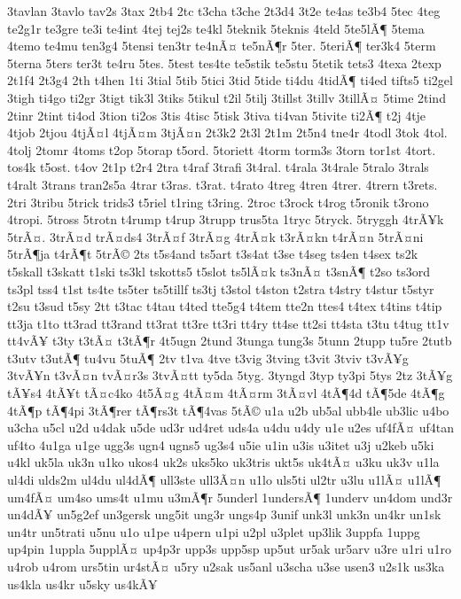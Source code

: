 {3tavlan
3tavlo
tav2s
3tax
2tb4
2tc
t3cha
t3che
2t3d4
3t2e
te4as
te3b4
5tec
4teg
te2g1r
te3gre
te3i
te4int
4tej
tej2s
te4kl
5teknik
5teknis
4teld
5te5lÃ¶
5tema
4temo
te4mu
ten3g4
5tensi
ten3tr
te4nÃ¤
te5nÃ¶r
5ter.
5teriÃ¶
ter3k4
5term
5terna
5ters
ter3t
te4ru
5tes.
5test
tes4te
te5stik
te5stu
5tetik
tets3
4texa
2texp
2t1f4
2t3g4
2th
t4hen
1ti
3tial
5tib
5tici
3tid
5tide
ti4du
4tidÃ¶
ti4ed
tifts5
ti2gel
3tigh
ti4go
ti2gr
3tigt
tik3l
3tiks
5tikul
t2il
5tilj
3tillst
3tillv
3tillÃ¤
5time
2tind
2tinr
2tint
ti4od
3tion
ti2os
3tis
4tisc
5tisk
3tiva
ti4van
5tivite
ti2Ã¶
t2j
4tje
4tjob
2tjou
4tjÃ¤l
4tjÃ¤m
3tjÃ¤n
2t3k2
2t3l
2t1m
2t5n4
tne4r
4todl
3tok
4tol.
4tolj
2tomr
4toms
t2op
5torap
t5ord.
5toriett
4torm
torm3s
3torn
tor1st
4tort.
tos4k
t5ost.
t4ov
2t1p
t2r4
2tra
t4raf
3trafi
3t4ral.
t4rala
3t4rale
5tralo
3trals
t4ralt
3trans
tran2s5a
4trar
t3ras.
t3rat.
t4rato
4treg
4tren
4trer.
4trern
t3rets.
2tri
3tribu
5trick
trids3
t5riel
t1ring
t3ring.
2troc
t3rock
t4rog
t5ronik
t3rono
4tropi.
5tross
5trotn
t4rump
t4rup
3trupp
trus5ta
1tryc
5tryck.
5tryggh
4trÃ¥k
5trÃ¤.
3trÃ¤d
trÃ¤ds4
3trÃ¤f
3trÃ¤g
4trÃ¤k
t3rÃ¤kn
t4rÃ¤n
5trÃ¤ni
5trÃ¶ja
t4rÃ¶t
5trÃ©
2ts
t5s4and
ts5art
t3s4at
t3se
t4seg
ts4en
t4sex
ts2k
t5skall
t3skatt
t1ski
ts3kl
tskotts5
t5slot
ts5lÃ¤k
ts3nÃ¤
t3snÃ¶
t2so
ts3ord
ts3pl
tss4
t1st
ts4te
ts5ter
ts5tillf
ts3tj
t3stol
t4ston
t2stra
t4stry
t4stur
t5styr
t2su
t3sud
t5sy
2tt
t3tac
t4tau
t4ted
tte5g4
t4tem
tte2n
ttes4
t4tex
t4tins
t4tip
tt3ja
t1to
tt3rad
tt3rand
tt3rat
tt3re
tt3ri
tt4ry
tt4se
tt2si
tt4sta
t3tu
t4tug
tt1v
tt4vÃ¥
t3ty
t3tÃ¤
t3tÃ¶r
4t5ugn
2tund
3tunga
tung3s
5tunn
2tupp
tu5re
2tutb
t3utv
t3utÃ¶
tu4vu
5tuÃ¶
2tv
t1va
4tve
t3vig
3tving
t3vit
3tviv
t3vÃ¥g
3tvÃ¥n
t3vÃ¤n
tvÃ¤r3s
3tvÃ¤tt
ty5da
5tyg.
3tyngd
3typ
ty3pi
5tys
2tz
3tÃ¥g
tÃ¥s4
4tÃ¥t
tÃ¤c4ko
4t5Ã¤g
4tÃ¤m
4tÃ¤rm
3tÃ¤vl
4tÃ¶4d
tÃ¶5de
4tÃ¶g
4tÃ¶p
tÃ¶4pi
3tÃ¶rer
tÃ¶rs3t
tÃ¶4vas
5tÃ©
u1a
u2b
ub5al
ubb4le
ub3lic
u4bo
u3cha
u5cl
u2d
u4dak
u5de
ud3r
ud4ret
uds4a
u4du
u4dy
u1e
u2es
uf4fÃ¤
uf4tan
uf4to
4u1ga
u1ge
ugg3s
ugn4
ugns5
ug3s4
u5ie
u1in
u3is
u3itet
u3j
u2keb
u5ki
u4kl
uk5la
uk3n
u1ko
ukos4
uk2s
uks5ko
uk3tris
ukt5s
uk4tÃ¤
u3ku
uk3v
u1la
ul4di
ulds2m
ul4du
ul4dÃ¶
ull3ste
ull3Ã¤n
u1lo
uls5ti
ul2tr
u3lu
u1lÃ¤
u1lÃ¶
um4fÃ¤
um4so
ums4t
u1mu
u3mÃ¶r
5underl
1undersÃ¶
1underv
un4dom
und3r
un4dÃ¥
un5g2ef
un3gersk
ung5it
ung3r
ungs4p
3unif
unk3l
unk3n
un4kr
un1sk
un4tr
un5trati
u5nu
u1o
u1pe
u4pern
u1pi
u2pl
u3plet
up3lik
3uppfa
1uppg
up4pin
1uppla
5upplÃ¤
up4p3r
upp3s
upp5sp
up5ut
ur5ak
ur5arv
u3re
u1ri
u1ro
u4rob
u4rom
urs5tin
ur4stÃ¤
u5ry
u2sak
us5anl
u3scha
u3se
usen3
u2s1k
us3ka
us4kla
us4kr
u5sky
us4kÃ¥
}
